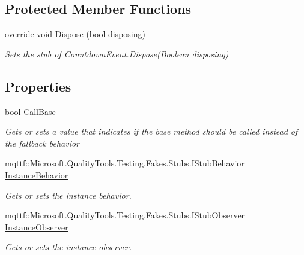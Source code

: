 \subsection*{Protected Member Functions}
\begin{DoxyCompactItemize}
\item 
override void \hyperlink{class_system_1_1_threading_1_1_fakes_1_1_stub_countdown_event_ad0a5973b0760b0c1a90249ceeeba8276}{Dispose} (bool disposing)
\begin{DoxyCompactList}\small\item\em Sets the stub of Countdown\-Event.\-Dispose(\-Boolean disposing)\end{DoxyCompactList}\end{DoxyCompactItemize}
\subsection*{Properties}
\begin{DoxyCompactItemize}
\item 
bool \hyperlink{class_system_1_1_threading_1_1_fakes_1_1_stub_countdown_event_a6d2b8be2b4ff54e301cd2bd019a66d83}{Call\-Base}
\begin{DoxyCompactList}\small\item\em Gets or sets a value that indicates if the base method should be called instead of the fallback behavior\end{DoxyCompactList}\item 
mqttf\-::\-Microsoft.\-Quality\-Tools.\-Testing.\-Fakes.\-Stubs.\-I\-Stub\-Behavior \hyperlink{class_system_1_1_threading_1_1_fakes_1_1_stub_countdown_event_a5aba6825191224976438127295740258}{Instance\-Behavior}
\begin{DoxyCompactList}\small\item\em Gets or sets the instance behavior.\end{DoxyCompactList}\item 
mqttf\-::\-Microsoft.\-Quality\-Tools.\-Testing.\-Fakes.\-Stubs.\-I\-Stub\-Observer \hyperlink{class_system_1_1_threading_1_1_fakes_1_1_stub_countdown_event_a75cb912f7bf345af0605d80f69ed9659}{Instance\-Observer}
\begin{DoxyCompactList}\small\item\em Gets or sets the instance observer.\end{DoxyCompactList}\end{DoxyCompactItemize}


